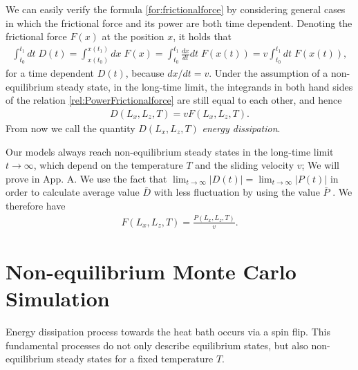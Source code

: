 We can easily verify the formula \eqref{for:frictionalforce} by considering general cases in which the frictional force and its power are both time dependent. Denoting the frictional force $F(x)$ at the position $x$, it holds that
\begin{align}
\int_{t_{0}}^{t_{1}}dt\;D(t)=\int_{x(t_{0})}^{x(t_{1})}dx\;F(x)=\int_{t_{0}}^{t_{1}}\frac{dx}{dt}dt\;F(x(t))=v\int_{t_{0}}^{t_{1}}dt\;F(x(t))\label{rel:PowerFrictionalforce},
\end{align}
for a time dependent $D(t)$, because $dx/dt=v$. Under the assumption of a non-equilibrium steady state, in the long-time limit, the integrands in both hand sides of the relation \eqref{rel:PowerFrictionalforce} are still equal to each other, and hence 
\begin{align}
D(L_{x}, L_{z}, T)=vF(L_{x}, L_{z}, T).
\end{align}
From now we call the quantity $D(L_{x}, L_{z}, T)$ \textit{energy dissipation}.

Our models always reach non-equilibrium steady states in the long-time limit $t\to\infty$, which depend on the temperature $T$ and the sliding velocity $v$; We will prove in App. A. We use the fact that $\lim_{t\to\infty}|D(t)|=\lim_{t\to\infty}|P(t)|$ in order to calculate average value $\bar{D}$ with less fluctuation by using the value $\bar{P}$ \cite{Magiera2009a, Magiera2011, Magiera2011b}. We therefore have
\begin{align}
F(L_{x}, L_{z}, T)=\frac{P(L_{x}, L_{z}, T)}{v}\label{for:frictionalforce2}.
\end{align}

\section{Non-equilibrium Monte Carlo Simulation}

Energy dissipation process towards the heat bath occurs via a spin flip. This fundamental processes do not only describe equilibrium states, but also non-equilibrium steady states for a fixed temperature $T$\cite{Glauber1963}. 